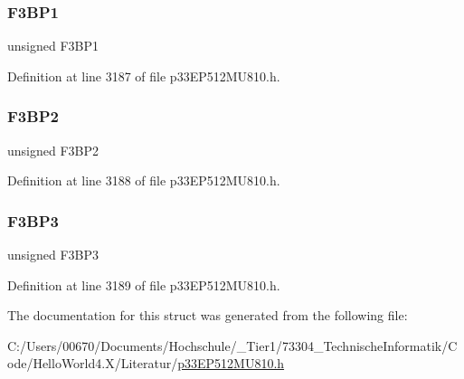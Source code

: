 \subsubsection{\texorpdfstring{F3\+B\+P1}{F3BP1}}
{\footnotesize\ttfamily unsigned F3\+B\+P1}



Definition at line 3187 of file p33\+E\+P512\+M\+U810.\+h.

\mbox{\label{structtag_c1_b_u_f_p_n_t1_b_i_t_s_a1e75d1073b686abfd1137ee647ae3147}} 
\subsubsection{\texorpdfstring{F3\+B\+P2}{F3BP2}}
{\footnotesize\ttfamily unsigned F3\+B\+P2}



Definition at line 3188 of file p33\+E\+P512\+M\+U810.\+h.

\mbox{\label{structtag_c1_b_u_f_p_n_t1_b_i_t_s_aee9920932ab1a451012ad6a2f4afaa19}} 
\subsubsection{\texorpdfstring{F3\+B\+P3}{F3BP3}}
{\footnotesize\ttfamily unsigned F3\+B\+P3}



Definition at line 3189 of file p33\+E\+P512\+M\+U810.\+h.



The documentation for this struct was generated from the following file\+:\begin{DoxyCompactItemize}
\item 
C\+:/\+Users/00670/\+Documents/\+Hochschule/\+\_\+\+Tier1/73304\+\_\+\+Technische\+Informatik/\+Code/\+Hello\+World4.\+X/\+Literatur/\hyperlink{p33_e_p512_m_u810_8h}{p33\+E\+P512\+M\+U810.\+h}\end{DoxyCompactItemize}
